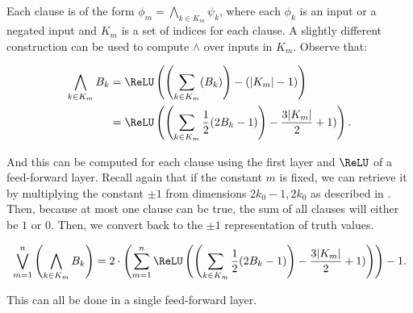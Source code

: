     Each clause is of the form $\phi_m = \bigwedge_{k\in K_m} \psi_k$, where each $\phi_k$ is an input or a negated input and $K_m$ is a set of indices for each clause. A slightly different construction can be used to compute $\land$ over inputs in $K_m$. Observe that:

    \begin{align*}
    \bigwedge_{k\in K_m} B_k &= \ReLU\left(\left(\sum_{k\in K_m} (B_k)\right) -(|K_m|-1)\right) \\ &=\ReLU\left(\left(\sum_{k\in K_m} \frac{1}{2}(2B_k-1) \right) - \frac{3|K_m|}{2}+1)\right).
    \end{align*}
    
    And this can be computed for each clause using the first layer and $\ReLU$ of a feed-forward layer. Recall again that if the constant $m$ is fixed, we can retrieve it by multiplying the constant $\pm 1$ from dimensions $2k_0-1,2k_0$ as described in . Then, because at most one clause can be true, the sum of all clauses will either be $1$ or $0$. Then, we convert back to the $\pm1$ representation of truth values. 

    \[\bigvee_{m=1}^n \left(\bigwedge_{k\in K_m} B_k \right)=2\cdot\left(\sum_{m=1}^n\ReLU\left(\left(\sum_{k\in K_m} \frac{1}{2}(2B_k-1) \right) - \frac{3|K_m|}{2}+1)\right)\right)-1.\]

    This can all be done in a single feed-forward layer.
